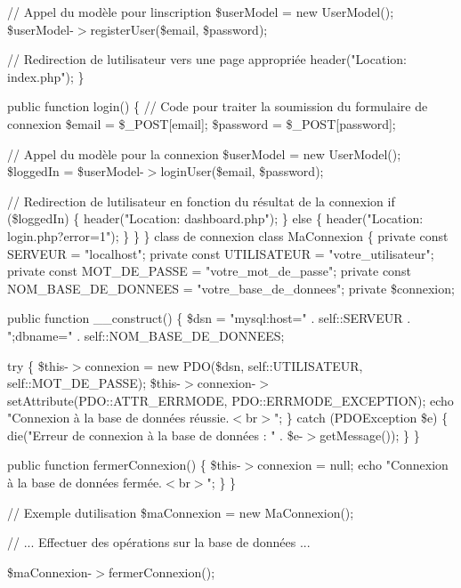 // Appel du modèle pour l\textquotesingle{}inscription \$user\+Model = new User\+Model(); \$user\+Model-\/\texorpdfstring{$>$}{>}register\+User(\$email, \$password);

// Redirection de l\textquotesingle{}utilisateur vers une page appropriée header("{}\+Location\+: index.\+php"{}); \}

public function login() \{ // Code pour traiter la soumission du formulaire de connexion \$email = \$\+\_\+\+POST\mbox{[}\textquotesingle{}email\textquotesingle{}\mbox{]}; \$password = \$\+\_\+\+POST\mbox{[}\textquotesingle{}password\textquotesingle{}\mbox{]};

// Appel du modèle pour la connexion \$user\+Model = new User\+Model(); \$logged\+In = \$user\+Model-\/\texorpdfstring{$>$}{>}login\+User(\$email, \$password);

// Redirection de l\textquotesingle{}utilisateur en fonction du résultat de la connexion if (\$logged\+In) \{ header("{}\+Location\+: dashboard.\+php"{}); \} else \{ header("{}\+Location\+: login.\+php?error=1"{}); \} \} \} class de connexion class Ma\+Connexion \{ private const SERVEUR = "{}localhost"{}; private const UTILISATEUR = "{}votre\+\_\+utilisateur"{}; private const MOT\+\_\+\+DE\+\_\+\+PASSE = "{}votre\+\_\+mot\+\_\+de\+\_\+passe"{}; private const NOM\+\_\+\+BASE\+\_\+\+DE\+\_\+\+DONNEES = "{}votre\+\_\+base\+\_\+de\+\_\+donnees"{}; private \$connexion;

public function \+\_\+\+\_\+construct() \{ \$dsn = "{}mysql\+:host="{} . self\+::\+SERVEUR . "{};dbname="{} . self\+::\+NOM\+\_\+\+BASE\+\_\+\+DE\+\_\+\+DONNEES;

try \{ \$this-\/\texorpdfstring{$>$}{>}connexion = new PDO(\$dsn, self\+::\+UTILISATEUR, self\+::\+MOT\+\_\+\+DE\+\_\+\+PASSE); \$this-\/\texorpdfstring{$>$}{>}connexion-\/\texorpdfstring{$>$}{>}set\+Attribute(\+PDO\+::\+ATTR\+\_\+\+ERRMODE, PDO\+::\+ERRMODE\+\_\+\+EXCEPTION); echo "{}\+Connexion à la base de données réussie.$<$br$>$"{}; \} catch (PDOException \$e) \{ die("{}\+Erreur de connexion à la base de données \+: "{} . \$e-\/\texorpdfstring{$>$}{>}get\+Message()); \} \}

public function fermer\+Connexion() \{ \$this-\/\texorpdfstring{$>$}{>}connexion = null; echo "{}\+Connexion à la base de données fermée.$<$br$>$"{}; \} \}

// Exemple d\textquotesingle{}utilisation \$ma\+Connexion = new Ma\+Connexion();

// ... Effectuer des opérations sur la base de données ...

\$ma\+Connexion-\/\texorpdfstring{$>$}{>}fermer\+Connexion(); 